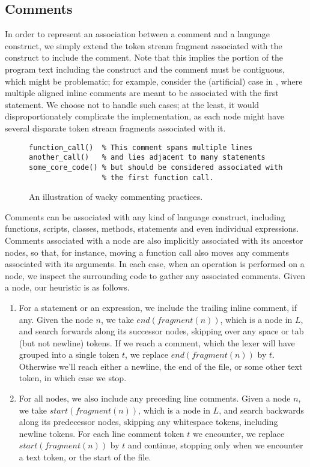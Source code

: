 \subsection{Comments}

In order to represent an association between a comment and a language
construct, we simply extend the token stream fragment associated with the
construct to include the comment. Note that this implies the portion of the
program text including the construct and the comment must be contiguous,
which might be problematic; for example, consider the (artificial) case
in , where multiple aligned inline comments are
meant to be associated with the first statement. We choose not to handle
such cases; at the least, it would disproportionately complicate the
implementation, as each node might have several disparate token stream
fragments associated with it.

\begin{figure}
\begin{lstlisting}[numbers=none, keepspaces=true]
function_call()  % This comment spans multiple lines
another_call()   % and lies adjacent to many statements
some_core_code() % but should be considered associated with
                 % the first function call.
\end{lstlisting}
\caption{An illustration of wacky commenting practices.}
\label{Fig:WackyComments}
\end{figure}

Comments can be associated with any kind of language construct, including
functions, scripts, classes, methods, statements and even individual
expressions. Comments associated with a node are also implicitly associated
with its ancestor nodes, so that, for instance, moving a function call also
moves any comments associated with its arguments. In each case, when an
operation is performed on a node, we inspect the surrounding code to gather any
associated comments. Given a node, our heuristic is as follows.

\begin{enumerate}
  \item For a statement or an expression, we include the trailing inline
    comment, if any. Given the node $n$, we take $end(fragment(n))$, which is a
    node in $L$, and search forwards along its successor nodes, skipping over
    any space or tab (but not newline) tokens. If we reach a comment, which the
    lexer will have grouped into a single token $t$, we replace
    $end(fragment(n))$ by $t$. Otherwise we'll reach either a newline, the end
    of the file, or some other text token, in which case we stop.
  \item For all nodes, we also include any preceding line comments. Given
    a node $n$, we take $start(fragment(n))$, which is a node in $L$, and
    search backwards along its predecessor nodes, skipping any whitespace
    tokens, including newline tokens. For each line comment token $t$ we
    encounter, we replace $start(fragment(n))$ by $t$ and continue, stopping
    only when we encounter a text token, or the start of the file.
\end{enumerate}

